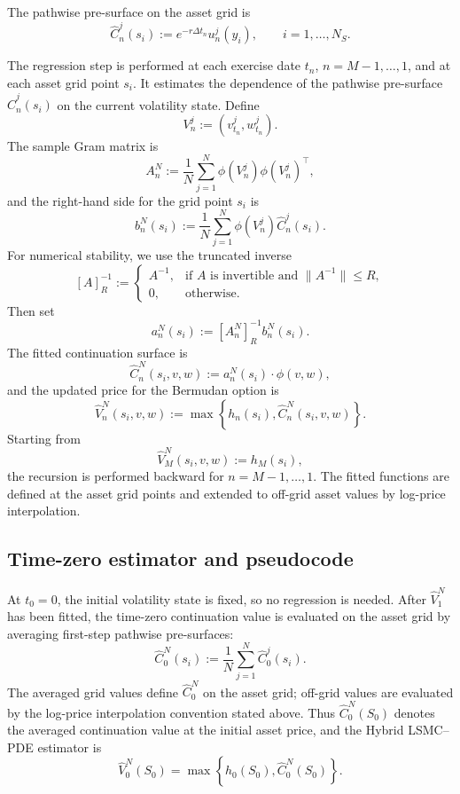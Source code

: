 \documentclass[pdflatex,sn-mathphys-num]{sn-jnl}
\theoremstyle{thmstyleone}%
\theoremstyle{thmstylethree}%
\theoremstyle{thmstyletwo}%
\begin{document}
The pathwise pre-surface on the asset grid is
$$
\widehat C_n^j(s_i)
:=
e^{-r\Delta t_n}u_n^j(y_i),
\qquad i=1,\ldots,N_S.
$$

The regression step is performed at each exercise date $t_n$,
$n=M-1,\ldots,1$, and at each asset grid point $s_i$. It estimates the
dependence of the pathwise pre-surface $\widehat C_n^j(s_i)$ on the current
volatility state. Define
$$
V_n^j:=(v_{t_n}^j,w_{t_n}^j).
$$
The sample Gram matrix is
$$
A_n^N
:=
\frac1N\sum_{j=1}^N
\phi(V_n^j)\phi(V_n^j)^\top,
$$
and the right-hand side for the grid point $s_i$ is
$$
b_n^N(s_i)
:=
\frac1N\sum_{j=1}^N
\phi(V_n^j)\widehat C_n^j(s_i).
$$
For numerical stability, we use the truncated inverse
\begin{equation}\label{eq:estimated_coeff}
[A]^{-1}_R
:=
\begin{cases}
A^{-1}, & \text{if $A$ is invertible and }\|A^{-1}\|\le R,\\
0,  & \text{otherwise.}
\end{cases}
\end{equation}
Then set
\begin{equation}
a_n^N(s_i):=[A_n^N]^{-1}_R b_n^N(s_i).
\label{eq:lsq}
\end{equation}
The fitted continuation surface is
$$
\widehat C_n^N(s_i,v,w)
:=
a_n^N(s_i)\cdot\phi(v,w),
$$
and the updated price for the Bermudan option is
$$
\widehat V_n^N(s_i,v,w)
:=
\max\left\{
h_n(s_i),
\widehat C_n^N(s_i,v,w)
\right\}.
$$
Starting from
$$
\widehat V_M^N(s_i,v,w):=h_M(s_i),
$$
the recursion is performed backward for $n=M-1,\ldots,1$. The fitted functions
are defined at the asset grid points and extended to off-grid asset values by
log-price interpolation.

\subsection{Time-zero estimator and pseudocode}
At $t_0=0$, the initial volatility state is fixed, so no regression is needed. After $\widehat V_1^N$ has been fitted, the time-zero
continuation value is evaluated on the asset grid by averaging first-step
pathwise pre-surfaces:
$$
\widehat C_0^N(s_i)
:=
\frac1N
\sum_{j=1}^{N}
\widehat C_0^j(s_i).
$$
The averaged grid values define $\widehat C_0^N$ on the asset grid; off-grid
values are evaluated by the log-price interpolation convention stated above.
Thus $\widehat C_0^N(S_0)$ denotes the averaged continuation value at the
initial asset price, and the Hybrid LSMC--PDE estimator is
\begin{equation}\label{eq:hybrid_est}
\widehat V_0^N(S_0)
=
\max\left\{
h_0(S_0),
\widehat C_0^N(S_0)
\right\}.
\end{equation}
\end{document}

